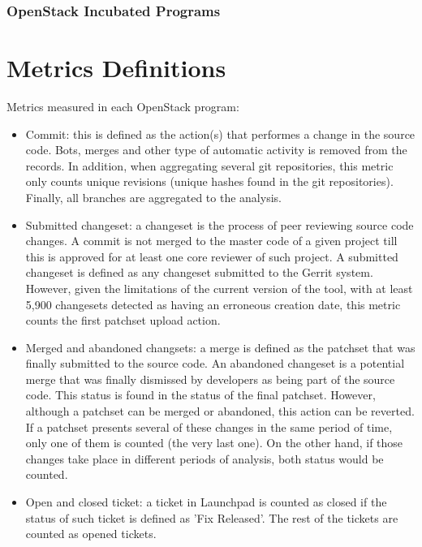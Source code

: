 \documentclass[a4wide,11pt]{report}
\begin{document}
\newpage
\subsection{OpenStack Incubated Programs}




\appendix{}

\chapter{Metrics Definitions}
\label{chap:metrics_definitions}

Metrics measured in each OpenStack program:

\begin{itemize}
\item Commit: this is defined as the action(s) that performes a change in the source code. 
Bots, merges and other type of automatic activity is removed from the records. In addition,
when aggregating several git repositories, this metric only counts unique revisions (unique hashes found in the git repositories).
Finally, all branches are aggregated to the analysis.

\item Submitted changeset: a changeset is the process of peer reviewing source code changes. A commit
is not merged to the master code of a given project till this is approved for at least one core
reviewer of such project. A submitted changeset is defined as any changeset submitted to the Gerrit
system. However, given the limitations of the current version of the tool, with at least 5,900 changesets
detected as having an erroneous creation date, this metric counts the first patchset upload action. 
 
\item Merged and abandoned changsets: a merge is defined as the patchset that was finally submitted to the 
source code. An abandoned changeset is a potential merge that was finally dismissed by developers as
being part of the source code. This status is found in the status of the final patchset. However, although
a patchset can be merged or abandoned, this action can be reverted. If a patchset presents several of 
these changes in the same period of time, only one of them is counted (the very last one). On the other hand,
if those changes take place in different periods of analysis, both status would be counted.

\item Open and closed ticket: a ticket in Launchpad is counted as closed if the status of such ticket is defined as 'Fix Released'.
The rest of the tickets are counted as opened tickets.


\end{itemize}
\end{document}
